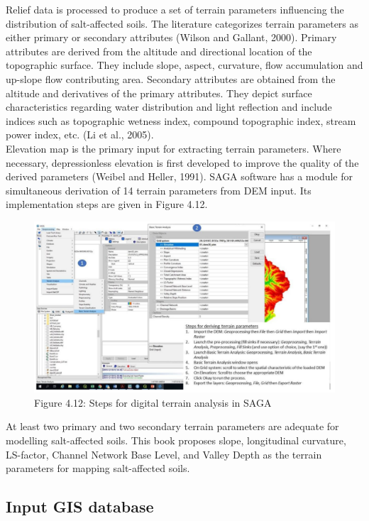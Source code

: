 \documentclass[
  10pt,
  b5paper,
]{book}
\begin{document}
Relief data is processed to produce a set of terrain parameters influencing the distribution of salt-affected soils. The literature categorizes terrain parameters as either primary or secondary attributes (Wilson and Gallant, 2000). Primary attributes are derived from the altitude and directional location of the topographic surface. They include slope, aspect, curvature, flow accumulation and up-slope flow contributing area. Secondary attributes are obtained from the altitude and derivatives of the primary attributes. They depict surface characteristics regarding water distribution and light reflection and include indices such as topographic wetness index, compound topographic index, stream power index, etc. (Li et al., 2005).\\
Elevation map is the primary input for extracting terrain parameters. Where necessary, depressionless elevation is first developed to improve the quality of the derived parameters (Weibel and Heller, 1991). SAGA software has a module for simultaneous derivation of 14 terrain parameters from DEM input. Its implementation steps are given in Figure 4.12.

\begin{figure}
\centering
\includegraphics{figures/images/Figure4.12.PNG}
\caption{Figure 4.12: Steps for digital terrain analysis in SAGA}
\end{figure}

At least two primary and two secondary terrain parameters are adequate for modelling salt-affected soils. This book proposes slope, longitudinal curvature, LS-factor, Channel Network Base Level, and Valley Depth as the terrain parameters for mapping salt-affected soils.

\hypertarget{input-gis-database}{%
\subsection{Input GIS database}\label{input-gis-database}}
\end{document}
